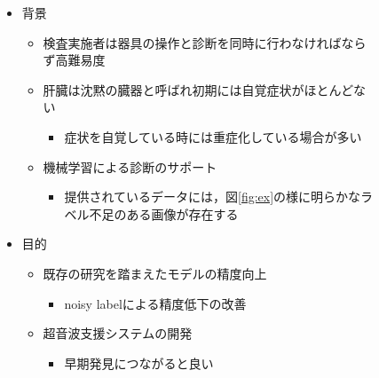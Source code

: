 \documentclass[a4j]{ujarticle}
\newcommand{\Fref}[1]{\mbox{図\ref{fig:#1}}}
\begin{document}
    \begin{figure}[h]
        \begin{minipage}{.59\textwidth}
            \begin{itemize}
                \item 背景
                \begin{itemize}
                    \item 検査実施者は器具の操作と診断を同時に行わなければならず高難易度
                    \item 肝臓は沈黙の臓器と呼ばれ初期には自覚症状がほとんどない
                    \begin{itemize}
                        \item 症状を自覚している時には重症化している場合が多い
                    \end{itemize}
                    \item 機械学習による診断のサポート
                    \begin{itemize}
                        \item 提供されているデータには，\Fref{ex}の様に明らかなラベル不足のある画像が存在する
                    \end{itemize}
                \end{itemize}
                \item 目的
                \begin{itemize}
                    \item 既存の研究を踏まえたモデルの精度向上
                    \begin{itemize}
                        \item noisy label\footnotemark[1]による精度低下の改善
                    \end{itemize}
                    \item 超音波支援システムの開発
                    \begin{itemize}
                        \item 早期発見につながると良い
                    \end{itemize}
                \end{itemize}
            \end{itemize}
        \end{minipage}
        \begin{minipage}{.39\textwidth}
            \centering

\end{minipage}
\end{figure}
\end{document}
